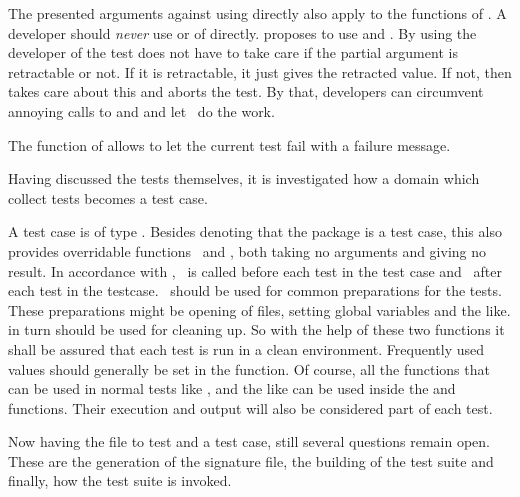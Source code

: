 The presented arguments against using \adname[PrimitiveType]{=} directly also apply to the functions of . A developer should {\it never} use  or  of  directly. \projectname proposes to use  and . By using  the developer of the test does not have to take care if the partial argument is retractable or not. If it is retractable, it just gives the retracted value. If not, then  takes care about this and aborts the test. By that, developers can circumvent annoying calls to  and  and let \projectname~do the work.

The function  of  allows to let the current test fail with a failure message.

Having discussed the tests themselves, it is investigated how a domain which collect tests becomes a test case.

A test case is of type . Besides denoting that the package is a test case, this also provides overridable functions ~and , both taking no arguments and giving no result. In accordance with \JUnit, ~is called before each test in the test case and ~after each test in the testcase. ~should be used for common preparations for the tests. These preparations might be opening of files, setting global variables and the like.  in turn should be used for cleaning up. So with the help of these two functions it shall be assured that each test is run in a clean environment. Frequently used values should generally be set in the  function. Of course, all the functions that can be used in normal tests like ,  and the like can be used inside the  and  functions. Their execution and output will also be considered part of each test.

Now having the file to test and a test case, still several questions remain open. These are the generation of the signature file, the building of the test suite and finally, how the test suite is invoked.

